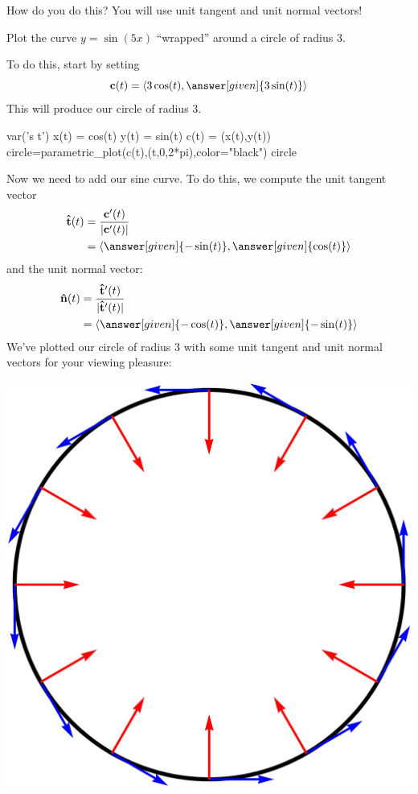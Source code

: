 \documentclass{ximera}
\begin{document}
How do you do this? You will use unit tangent and unit normal vectors!
\begin{example}
  Plot the curve $y= \sin(5x)$ ``wrapped'' around a circle of radius $3$.
  \begin{explanation}
    To do this, start by setting
    \[
    \vec{c}(t) = \vector{3\cos(t),\answer[given]{3\sin(t)}}
    \]
    This will produce our circle of radius $3$.
\begin{onlineOnly}
\begin{sageCell}
var('s t')
x(t) = cos(t)
y(t) = sin(t)
c(t) = (x(t),y(t))
circle=parametric_plot(c(t),(t,0,2*pi),color="black")
circle
\end{sageCell}
\end{onlineOnly}
Now we need to add our sine curve. To do this, we compute the unit tangent vector
\begin{align*}
  \utan(t) &= \frac{\vec{c}'(t)}{|\vec{c}'(t)|}\\
  &=\vector{\answer[given]{-\sin(t)},\answer[given]{\cos(t)}}
\end{align*}
and the unit normal vector:
\begin{align*}
  \unormal(t) &= \frac{\utan'(t)}{|\utan'(t)|}\\
  &=\vector{\answer[given]{-\cos(t)},\answer[given]{-\sin(t)}}
\end{align*}
We've plotted our circle of radius $3$ with some unit tangent and unit
normal vectors for your viewing pleasure:
\begin{image}
  \includegraphics{circleArrows.jpg}

\end{image}
\end{explanation}
\end{example}
\end{document}
